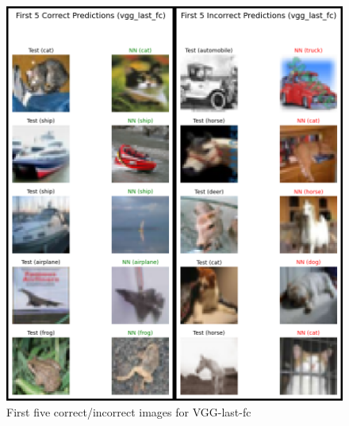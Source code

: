 \documentclass{article}
\begin{document}
\begin{figure}[h]
  \includegraphics[height=0.75\textheight,width=\textwidth]{vgg_last_fc.png}
  \caption{First five correct/incorrect images for VGG-last-fc}
\end{figure}
\end{document}
